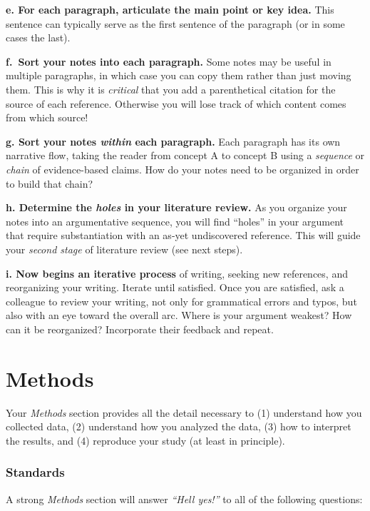 \documentclass[
]{book}
\begin{document}
\textbf{e. For each paragraph, articulate the main point or key idea.} This sentence can typically serve as the first sentence of the paragraph (or in some cases the last).

\textbf{f.~Sort your notes into each paragraph.} Some notes may be useful in multiple paragraphs, in which case you can copy them rather than just moving them. This is why it is \emph{critical} that you add a parenthetical citation for the source of each reference. Otherwise you will lose track of which content comes from which source!

\textbf{g. Sort your notes \emph{within} each paragraph.} Each paragraph has its own narrative flow, taking the reader from concept A to concept B using a \emph{sequence} or \emph{chain} of evidence-based claims. How do your notes need to be organized in order to build that chain?

\textbf{h. Determine the \emph{holes} in your literature review.} As you organize your notes into an argumentative sequence, you will find ``holes'' in your argument that require substantiation with an as-yet undiscovered reference. This will guide your \emph{second stage} of literature review (see next steps).

\textbf{i. Now begins an iterative process} of writing, seeking new references, and reorganizing your writing. Iterate until satisfied. Once you are satisfied, ask a colleague to review your writing, not only for grammatical errors and typos, but also with an eye toward the overall arc. Where is your argument weakest? How can it be reorganized? Incorporate their feedback and repeat.

\hypertarget{methods}{%
\section*{Methods}\label{methods}}

Your \emph{Methods} section provides all the detail necessary to (1) understand how you collected data, (2) understand how you analyzed the data, (3) how to interpret the results, and (4) reproduce your study (at least in principle).

\hypertarget{standards-2}{%
\subsubsection*{Standards}\label{standards-2}}

A strong \emph{Methods} section will answer \emph{``Hell yes!''} to all of the following questions:
\end{document}
